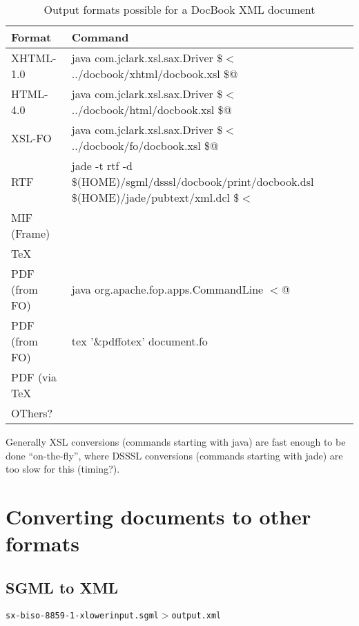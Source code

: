 \begin{table}[htbp]
  \begin{center}
    \begin{tabular}[tb]{|l|p{12cm}|}
\hline\hline
Format & Command \\
\hline
  XHTML-1.0 & java com.jclark.xsl.sax.Driver \$$<$ ../docbook/xhtml/docbook.xsl \$@\\
  HTML-\textsf{4.0} & java com.jclark.xsl.sax.Driver \$$<$
  ../docbook/html/docbook.xsl \$@ \\

  XSL-FO & java com.jclark.xsl.sax.Driver \$$<$ ../docbook/fo/docbook.xsl \$@ \\
  RTF & jade -t rtf -d \$(HOME)/sgml/dsssl/docbook/print/docbook.dsl \$(HOME)/jade/pubtext/xml.dcl \$$<$\\
  MIF (Frame) & \\
  {\TeX} & \\
  PDF (from FO) & java org.apache.fop.apps.CommandLine $< $@\\
  PDF (from FO) & tex '\&pdffotex' document.fo \\
  PDF (via {\TeX} & \\
  OThers? & \\
\hline
    \end{tabular}
    \caption{Output formats possible for a DocBook XML document}
    \label{tab:output-formats-possible-for-a-docbook-xml-document}
  \end{center}
\end{table}

Generally XSL conversions (commands starting with java) are fast
enough to be done ``on-the-fly'', where DSSSL conversions (commands
starting with jade) are \textsf{too slow for this (timing?)}.



\section{Converting documents to other formats}
\label{sec:docbook-converting-documents-to-other-formats}


\subsection{SGML to XML}
\label{docbook-converting-sgml-to-xml}

\begin{alltt}
  sx -biso-8859-1 -xlower input.sgml $>$ output.xml
\end{alltt}

